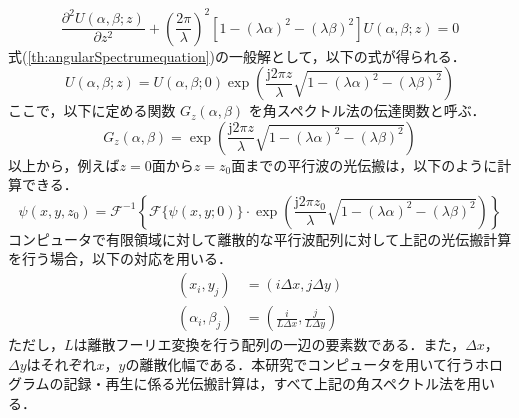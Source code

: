 \begin{equation}
    \label{th:angularSpectrumequation}
    \frac{\partial^2 U(\alpha,\beta;z)}{\partial z^2} + \left( \frac{2 \pi}{\lambda} \right)^2 \left[ 1 - \left( \lambda \alpha \right)^2 - \left( \lambda \beta \right)^2 \right]U(\alpha,\beta;z) = 0
\end{equation}
式(\ref{th:angularSpectrumequation})の一般解として，以下の式が得られる．
\begin{equation}
    \label{th:angularSpectrumSolution}
    U(\alpha,\beta;z) = U(\alpha,\beta;0) \exp{\left( \frac{\mathrm{j}2\pi z}{\lambda} \sqrt{1-\left( \lambda \alpha \right)^2 - \left( \lambda \beta \right)^2} \right)}
\end{equation}
ここで，以下に定める関数 $G_z(\alpha,\beta)$ を角スペクトル法の伝達関数と呼ぶ．
\begin{equation}
    \label{th:angularSpectrumTransferFunction}
    G_z(\alpha,\beta) = \exp{\left( \frac{\mathrm{j}2\pi z}{\lambda} \sqrt{1-\left( \lambda \alpha \right)^2 - \left( \lambda \beta \right)^2} \right)}
\end{equation}
以上から，例えば$z=0$面から$z=z_0$面までの平行波の光伝搬は，以下のように計算できる．
\begin{equation}
    \label{th:lightProp_angularSpectrum}
    \psi(x,y,z_0) = \mathcal{F}^{-1}\left\{ \mathcal{F}\{\psi(x,y;0)\} \cdot \exp{\left( \frac{\mathrm{j}2\pi z_0}{\lambda} \sqrt{1-\left( \lambda \alpha \right)^2 - \left( \lambda \beta \right)^2} \right)} \right\}
\end{equation}
コンピュータで有限領域に対して離散的な平行波配列に対して上記の光伝搬計算を行う場合，以下の対応を用いる．
\begin{align}
    (x_i,y_j) &=  \left( i \Delta x , j\Delta y \right)\\
    (\alpha_i,\beta_j) &= \left( \frac{i}{L\Delta x} , \frac{j}{L\Delta y} \right)
\end{align}
ただし，$L$は離散フーリエ変換を行う配列の一辺の要素数である．また，$\Delta x$，$\Delta y$はそれぞれ$x$，$y$の離散化幅である．本研究でコンピュータを用いて行うホログラムの記録・再生に係る光伝搬計算は，すべて上記の角スペクトル法を用いる．

